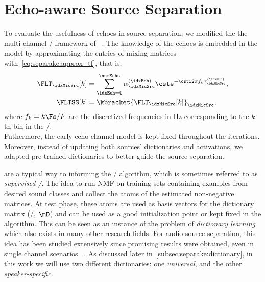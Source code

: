 \section{Echo-aware Source Separation}
To evaluate the usefulness of echoes in source separation, we modified the the multi-channel \NMF/ framework of \citeauthor{ozerov2010multichannel}~.
The knowledge of the echoes is embedded in the model by approximating the entries of mixing matrices with~\eqref{eq:separake:approx_tf}, that is,
\begin{equation}
    \begin{aligned}
        \FLT_{\idxMicSrc}[k] &= \sum_{\idxEch=0}^{\numEchs} \alpha_{\idxMicSrc}^{(\idxEch)} \cste^{-\csti 2 \pi f_k \tau_{\idxMicSrc}^{(\idxEch)}},\\
        \FLTSS[k] &= \kbracket{\FLT_{\idxMicSrc}[k]}_{\idxMicSrc},
    \end{aligned}
\end{equation}
where $f_k = k\Fs/F$ are the discretized frequencies in Hz corresponding to the $k$-th bin in the \DFT/.
\\Futhermore, the early-echo channel model is kept fixed throughout the iterations.
Moreover, instead of updating both sources' dictionaries and activations, we adapted pre-trained dictionaries to better guide the source separation.

 are a typical way to informing the \NMF/ algorithm, which is sometimes referred to as \textit{supervised \NMF/}.
The idea to run NMF on training sets containing examples from desired sound classes and collect the atoms of the estimated non-negative matrices.
At test phase, these atoms are used as basis vectors for the dictionary matrix (\ie/, $\mD$) and can be used as a good initialization point or kept fixed in the algorithm.
This can be seen as an instance of the problem of \textit{dictionary learning} which also exists in many other research fields.
For audio source separation, this idea has been studied extensively since promising results were obtained, even in single channel scenarios ~.
As discussed later in~\cref{subsec:separake:dictionary}, in this work we will use two different dictionaries: one \textit{universal}, and the other \textit{speaker-specific}.

